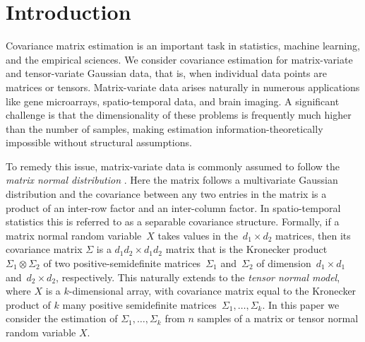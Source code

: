 \documentclass[aos]{imsart}
\theoremstyle{definition}
\numberwithin{equation}{section}
\newcommand{\ot}{\otimes}
\begin{document}
\section{Introduction}
Covariance matrix estimation is an important task in statistics, machine learning, and the empirical sciences.
We consider covariance estimation for matrix-variate and tensor-variate Gaussian data, that is, when individual data points are matrices or tensors. Matrix-variate data arises naturally in numerous applications like gene microarrays, spatio-temporal data, and brain imaging.
A significant challenge is that the dimensionality of these problems is frequently much higher than the number of samples, making estimation information-theoretically impossible without structural assumptions.

To remedy this issue, matrix-variate data is commonly assumed to follow the \emph{matrix normal distribution} \citep{dutilleul1999mle,werner2008estimation}.
Here the matrix follows a multivariate Gaussian distribution and the covariance between any two entries in the matrix is a product of an inter-row factor and an inter-column factor.
In spatio-temporal statistics this is referred to as a separable covariance structure.
Formally, if a matrix normal random variable~$X$ takes values in the~$d_1\times d_2$ matrices, then its covariance matrix $\Sigma$ is a $d_1d_2\times d_1 d_2$ matrix that is the Kronecker product~$\Sigma_1 \ot \Sigma_2$ of two positive-semidefinite matrices~$\Sigma_1$ and~$\Sigma_2$ of dimension~$d_1\times d_1$ and~$d_2\times d_2$, respectively.
This naturally extends to the \emph{tensor normal model}, where $X$ is a $k$-dimensional array, with covariance matrix equal to the Kronecker product of $k$ many positive semidefinite matrices~$\Sigma_1, \dots, \Sigma_k$.
In this paper we consider the estimation of $\Sigma_1, \dots, \Sigma_k$ from $n$ samples of a matrix or tensor normal random variable $X$.
\end{document}
